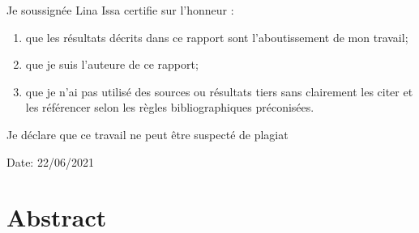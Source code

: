 \documentclass[a4paper, twoside, 12pt]{article}
\numberwithin{equation}{section}
\begin{document}
\newpage
\thispagestyle{empty}
\noindent Je soussignée Lina Issa certifie sur l'honneur :
\begin{enumerate}
\item que les résultats décrits dans ce rapport sont l'aboutissement de mon travail;
\item que je suis l'auteure de ce rapport; 
\item que je n'ai pas utilisé des sources ou résultats tiers sans clairement les citer et les référencer selon les règles bibliographiques préconisées. 
\end{enumerate}
Je déclare que ce travail ne peut être suspecté de plagiat 

Date: 22/06/2021
\newpage


\section*{Abstract}
\end{document}
